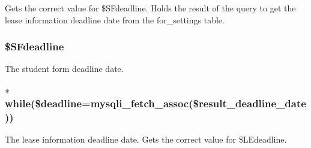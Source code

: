 \-Gets the correct value for \$\-S\-Fdeadline. \-Holds the result of the query to get the lease information deadline date from the for\-\_\-settings table. \hypertarget{user__view_2index_8php_a63601fc31b0f0ebad01c582a39f7c946}{
\subsubsection[{\$\-S\-Fdeadline}]{\setlength{\rightskip}{0pt plus 5cm}\$\-S\-Fdeadline}}\label{user__view_2index_8php_a63601fc31b0f0ebad01c582a39f7c946}
\-The student form deadline date. \hypertarget{user__view_2index_8php_a2a213019ea4973a06bcd525b4fd4ab82}{
\subsubsection[{while}]{\setlength{\rightskip}{0pt plus 5cm}$\ast$ {\bf while}(\$deadline=mysqli\-\_\-fetch\-\_\-assoc(\$result\-\_\-deadline\-\_\-date))}}\label{user__view_2index_8php_a2a213019ea4973a06bcd525b4fd4ab82}
\-The lease information deadline date. \-Gets the correct value for \$\-L\-Edeadline. 